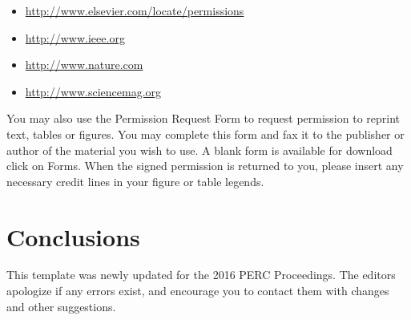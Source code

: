 \documentclass[english,aps,pra,reprint,noshowpacs,superscriptaddress]{revtex4-1}
\begin{document}
\begin{itemize}
\item \url{http://www.elsevier.com/locate/permissions}
\item \url{http://www.ieee.org}
\item \url{http://www.nature.com}
\item \url{http://www.sciencemag.org}
\end{itemize}

You may also use the Permission Request Form to request permission to
reprint text, tables or figures. You may complete this form and fax it
to the publisher or author of the material you wish to use. A blank
form is available for download click on Forms. When the signed
permission is returned to you, please insert any necessary credit
lines in your figure or table legends.


\section{Conclusions}
This template was newly updated for the 2016 PERC Proceedings.  The
editors apologize if any errors exist, and encourage you to contact
them with changes and other suggestions.  


\end{document}
